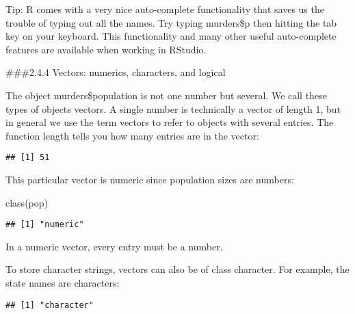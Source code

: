 \documentclass[
]{article}
\newenvironment{Shaded}{\begin{snugshade}}{\end{snugshade}}
\newcommand{\FunctionTok}[1]{\textcolor[rgb]{0.00,0.00,0.00}{#1}}
\newcommand{\NormalTok}[1]{#1}
\newcommand{\OtherTok}[1]{\textcolor[rgb]{0.56,0.35,0.01}{#1}}
\newcommand{\SpecialCharTok}[1]{\textcolor[rgb]{0.00,0.00,0.00}{#1}}
\begin{document}
Tip: R comes with a very nice auto-complete functionality that saves us
the trouble of typing out all the names. Try typing murders\$p then
hitting the tab key on your keyboard. This functionality and many other
useful auto-complete features are available when working in RStudio.

\#\#\#2.4.4 Vectors: numerics, characters, and logical

The object murders\$population is not one number but several. We call
these types of objects vectors. A single number is technically a vector
of length 1, but in general we use the term vectors to refer to objects
with several entries. The function length tells you how many entries are
in the vector:

\begin{Shaded}
\end{Shaded}

\begin{verbatim}
## [1] 51
\end{verbatim}

This particular vector is numeric since population sizes are numbers:

\begin{Shaded}
\begin{Highlighting}[]
\FunctionTok{class}\NormalTok{(pop)}
\end{Highlighting}
\end{Shaded}

\begin{verbatim}
## [1] "numeric"
\end{verbatim}

In a numeric vector, every entry must be a number.

To store character strings, vectors can also be of class character. For
example, the state names are characters:

\begin{Shaded}
\end{Shaded}

\begin{verbatim}
## [1] "character"
\end{verbatim}
\end{document}
